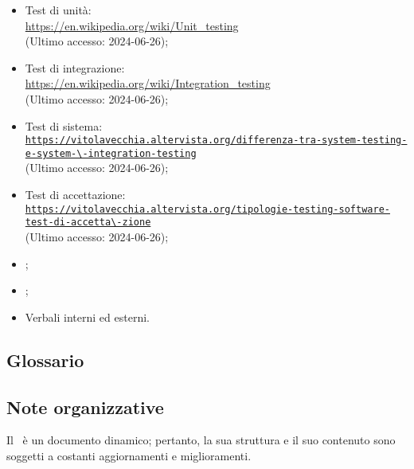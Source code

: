 \begin{itemize}
  \item Test di unità: \\ \href{https://en.wikipedia.org/wiki/Unit_testing}{https://en.wikipedia.org/wiki/Unit\_testing}  \\ (Ultimo accesso: 2024-06-26);
  \item Test di integrazione: \\ \href{https://en.wikipedia.org/wiki/Integration_testing}{https://en.wikipedia.org/wiki/Integration\_testing}  \\ (Ultimo accesso: 2024-06-26);
  \item Test di sistema: \\ \href{https://vitolavecchia.altervista.org/differenza-tra-system-testing-e-system-integration-testing}{\nolinkurl{https://vitolavecchia.altervista.org/differenza-tra-system-testing-e-system-\-integration-testing}}  \\ (Ultimo accesso: 2024-06-26);
  \item Test di accettazione: \\ \href{https://vitolavecchia.altervista.org/tipologie-testing-software-test-di-accettazione}{\nolinkurl{https://vitolavecchia.altervista.org/tipologie-testing-software-test-di-accetta\-zione}}  \\ (Ultimo accesso: 2024-06-26);
  \item \Glossario;
  \item \PianoDiProgetto;
  \item Verbali interni ed esterni.
\end{itemize}

\subsection{Glossario} 
\GlossarioIntroduzione

\subsection{Note organizzative}

\par Il \PdQ\ è un documento dinamico; pertanto, la sua struttura e il suo contenuto sono soggetti a costanti aggiornamenti e miglioramenti.
